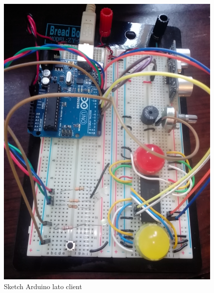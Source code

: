 \begin{figure}[!ht]
	\centering
	\includegraphics[scale=.08]{img/real2.jpg}
	\caption{Sketch Arduino lato client}
\end{figure}